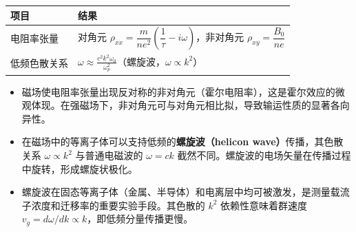 \begin{formulabox}[答案汇总]
\begin{center}
\begin{tabular}{ll}
\toprule
\textbf{项目} & \textbf{结果} \\
\midrule
电阻率张量 & 对角元 $\rho_{xx}=\dfrac{m}{ne^2}\left(\dfrac{1}{\tau}-i\omega\right)$，非对角元 $\rho_{xy}=\dfrac{B_0}{ne}$ \\
低频色散关系 & $\displaystyle\omega\approx\frac{c^2k^2\omega_0}{\omega_p^2}$（螺旋波，$\omega\propto k^2$） \\
\bottomrule
\end{tabular}
\end{center}
\end{formulabox}

\begin{insightbox}[物理图像]
\begin{itemize}
    \item 磁场使电阻率张量出现反对称的非对角元（霍尔电阻率），这是霍尔效应的微观体现。在强磁场下，非对角元可与对角元相比拟，导致输运性质的显著各向异性。
    \item 在磁场中的等离子体可以支持低频的\textbf{螺旋波（helicon wave）}传播，其色散关系 $\omega\propto k^2$ 与普通电磁波的 $\omega=ck$ 截然不同。螺旋波的电场矢量在传播过程中旋转，形成螺旋状极化。
    \item 螺旋波在固态等离子体（金属、半导体）和电离层中均可被激发，是测量载流子浓度和迁移率的重要实验手段。其色散的 $k^2$ 依赖性意味着群速度 $v_g=d\omega/dk\propto k$，即低频分量传播更慢。
\end{itemize}
\end{insightbox}
